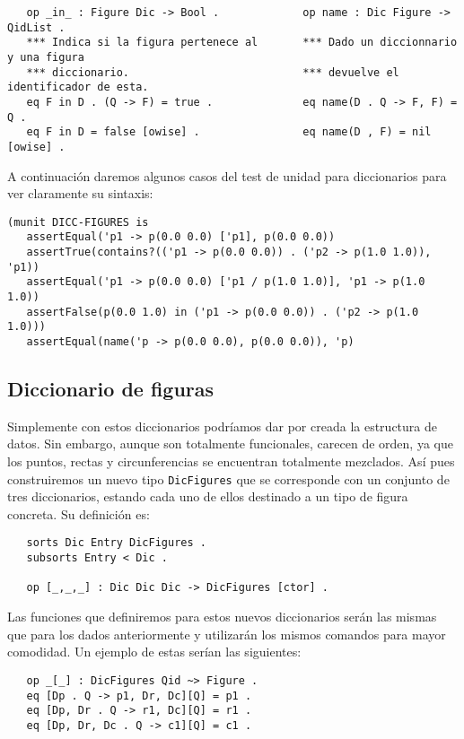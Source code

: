 {\codesize
\begin{verbatim}
   op _in_ : Figure Dic -> Bool .             op name : Dic Figure -> QidList .
   *** Indica si la figura pertenece al       *** Dado un diccionnario y una figura 
   *** diccionario.                           *** devuelve el identificador de esta.
   eq F in D . (Q -> F) = true .              eq name(D . Q -> F, F) = Q .
   eq F in D = false [owise] .                eq name(D , F) = nil [owise] . 
\end{verbatim}
}

A continuación daremos algunos casos del test de unidad para diccionarios para ver claramente su sintaxis:

{\codesize
\begin{verbatim}
(munit DICC-FIGURES is
   assertEqual('p1 -> p(0.0 0.0) ['p1], p(0.0 0.0))
   assertTrue(contains?(('p1 -> p(0.0 0.0)) . ('p2 -> p(1.0 1.0)), 'p1))
   assertEqual('p1 -> p(0.0 0.0) ['p1 / p(1.0 1.0)], 'p1 -> p(1.0 1.0))
   assertFalse(p(0.0 1.0) in ('p1 -> p(0.0 0.0)) . ('p2 -> p(1.0 1.0)))
   assertEqual(name('p -> p(0.0 0.0), p(0.0 0.0)), 'p)
\end{verbatim}
}


\subsection{Diccionario de figuras}

Simplemente con estos diccionarios podríamos dar por creada la estructura de datos. Sin embargo, aunque son totalmente funcionales, carecen de orden, ya que los puntos, rectas y circunferencias se encuentran totalmente mezclados. Así pues construiremos un nuevo tipo \texttt{DicFigures} que se corresponde con un conjunto de tres diccionarios, estando cada uno de ellos destinado a un tipo de figura concreta. Su definición es:

{\codesize
\begin{verbatim}
   sorts Dic Entry DicFigures .
   subsorts Entry < Dic .

   op [_,_,_] : Dic Dic Dic -> DicFigures [ctor] .
\end{verbatim}
}

Las funciones que definiremos para estos nuevos diccionarios serán las mismas que para los dados anteriormente y utilizarán los mismos comandos para mayor comodidad. Un ejemplo de estas serían las siguientes:\par

{\codesize
\begin{verbatim}
   op _[_] : DicFigures Qid ~> Figure .
   eq [Dp . Q -> p1, Dr, Dc][Q] = p1 .
   eq [Dp, Dr . Q -> r1, Dc][Q] = r1 .
   eq [Dp, Dr, Dc . Q -> c1][Q] = c1 . 
\end{verbatim}
}


